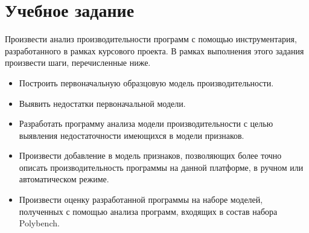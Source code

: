 \section*{Учебное задание}
Произвести анализ производительности программ с помощью инструментария, разработанного в рамках курсового проекта. В рамках выполнения этого задания произвести шаги, перечисленные ниже.
\begin{itemize}
	\item Построить первоначальную образцовую модель производительности.
	\item Выявить недостатки первоначальной модели.
	\item Разработать программу анализа модели производительности с целью выявления недостаточности имеющихся в модели признаков.
	\item Произвести добавление в модель признаков, позволяющих более точно описать производительность программы на данной платформе, в ручном или автоматическом режиме.
	\item Произвести оценку разработанной программы на наборе моделей, полученных с помощью анализа программ, входящих в состав набора Polybench.
\end{itemize}
